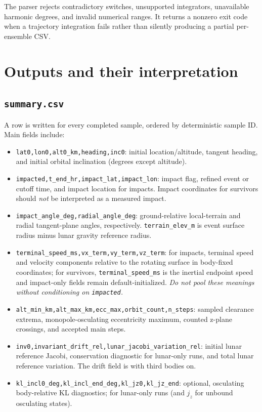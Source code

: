 \documentclass[11pt,a4paper]{article}
\newcommand{\pathcode}[1]{\nolinkurl{#1}}
\newcommand{\kbd}[1]{\texttt{\detokenize{#1}}}
\begin{document}
\begin{note}
The parser rejects contradictory switches, unsupported integrators, unavailable harmonic degrees, and invalid numerical ranges. It returns a nonzero exit code when a trajectory integration fails rather than silently producing a partial per-ensemble CSV.
\end{note}

\section{Outputs and their interpretation}
\subsection{\pathcode{summary.csv}}
A row is written for every completed sample, ordered by deterministic sample ID. Main fields include:
\begin{itemize}
\item \pathcode{lat0,lon0,alt0_km,heading,inc0}: initial location/altitude, tangent heading, and initial orbital inclination (degrees except altitude).
\item \pathcode{impacted,t_end_hr,impact_lat,impact_lon}: impact flag, refined event or cutoff time, and impact location for impacts. Impact coordinates for survivors should \emph{not} be interpreted as a measured impact.
\item \pathcode{impact_angle_deg,radial_angle_deg}: ground-relative local-terrain and radial tangent-plane angles, respectively. \pathcode{terrain_elev_m} is event surface radius minus lunar gravity reference radius.
\item \pathcode{terminal_speed_ms,vx_term,vy_term,vz_term}: for impacts, terminal speed and velocity components relative to the rotating surface in body-fixed coordinates; for survivors, \pathcode{terminal_speed_ms} is the inertial endpoint speed and impact-only fields remain default-initialized. \emph{Do not pool these meanings without conditioning on \pathcode{impacted}.}
\item \pathcode{alt_min_km,alt_max_km,ecc_max,orbit_count,n_steps}: sampled clearance extrema, monopole-osculating eccentricity maximum, counted z-plane crossings, and accepted main steps.
\item \pathcode{inv0,invariant_drift_rel,lunar_jacobi_variation_rel}: initial lunar reference Jacobi, conservation diagnostic for lunar-only runs, and total lunar reference variation. The drift field is \kbd{nan} with third bodies on.
\item \pathcode{kl_incl0_deg,kl_incl_end_deg,kl_jz0,kl_jz_end}: optional, osculating body-relative KL diagnostics; \kbd{nan} for lunar-only runs (and \(j_z\) for unbound osculating states).
\end{itemize}
\end{document}
